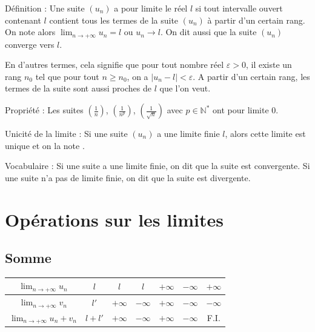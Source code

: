 \documentclass[11pt,a4paper]{article}
\begin{document}
\begin{boiteDef}{Définition :}
    Une suite $(u_n)$ a pour limite le réel $l$ si tout intervalle ouvert contenant $l$ contient tous les termes de la suite $(u_n)$ à partir d'un certain rang.
    \newline
    On note alors $\displaystyle \lim_{n \to +\infty} u_n = l$ ou $u_n \to l$.
    \newline
    On dit aussi que la suite $(u_n)$ converge vers $l$.
\end{boiteDef}

\begin{flushleft}
    En d'autres termes, cela signifie que pour tout nombre réel $\varepsilon > 0$, il existe un rang $n_0$ tel que pour tout $n \geq n_0$, on a $|u_n - l| < \varepsilon$.
    \newline
    A partir d'un certain rang, les termes de la suite sont aussi proches de $l$ que l'on veut.
\end{flushleft}

\begin{boiteProp}{Propriété :}
    Les suites $(\frac{1}{n})$, $(\frac{1}{n^p})$, $(\frac{1}{\sqrt{n}})$ avec $p \in \mathbb{N}^*$ ont pour limite $0$.
\end{boiteProp}

\begin{boiteProp}{Unicité de la limite :}
    Si une suite $(u_n)$ a une limite finie $l$, alors cette limite est unique et on la note .
\end{boiteProp}

\begin{boiteRemarque}{Vocabulaire :}
    Si une suite a une limite finie, on dit que la suite est convergente.
    \newline
    Si une suite n'a pas de limite finie, on dit que la suite est divergente.
\end{boiteRemarque}

\section{Opérations sur les limites}

\subsection{Somme}
\begin{center}
\begin{tabular}{|c|c|c|c|c|c|c|}
\hline
$\displaystyle \lim_{n\to+\infty} u_n$ & $l$ & $l$ & $l$ & $+\infty$ & $-\infty$ & $+\infty$ \\ \hline
$\displaystyle \lim_{n\to+\infty} v_n$ & $l'$ & $+\infty$ & $-\infty$ & $+\infty$ & $-\infty$ & $-\infty$ \\ \hline
$\displaystyle \lim_{n\to+\infty} u_n+v_n$ & $l+l'$ & $+\infty$ & $-\infty$ & $+\infty$ & $-\infty$ & F.I. \\ \hline
\end{tabular}
\end{center}
\end{document}
